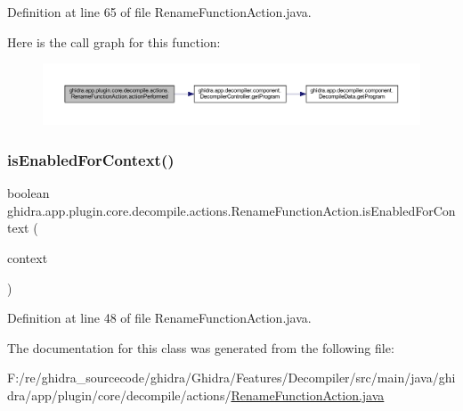 Definition at line 65 of file Rename\+Function\+Action.\+java.

Here is the call graph for this function\+:
\nopagebreak
\begin{figure}[H]
\begin{center}
\leavevmode
\includegraphics[width=350pt]{classghidra_1_1app_1_1plugin_1_1core_1_1decompile_1_1actions_1_1_rename_function_action_a67fbf7fa2650bcc9761f5f92f2d4a741_cgraph}
\end{center}
\end{figure}
\mbox{\label{classghidra_1_1app_1_1plugin_1_1core_1_1decompile_1_1actions_1_1_rename_function_action_a68d2dcd140bdd31b9eedfcca3b08450d}} 
\subsubsection{\texorpdfstring{isEnabledForContext()}{isEnabledForContext()}}
{\footnotesize\ttfamily boolean ghidra.\+app.\+plugin.\+core.\+decompile.\+actions.\+Rename\+Function\+Action.\+is\+Enabled\+For\+Context (\begin{DoxyParamCaption}\item[{Action\+Context}]{context }\end{DoxyParamCaption})\hspace{0.3cm}{\ttfamily [inline]}}



Definition at line 48 of file Rename\+Function\+Action.\+java.



The documentation for this class was generated from the following file\+:\begin{DoxyCompactItemize}
\item 
F\+:/re/ghidra\+\_\+sourcecode/ghidra/\+Ghidra/\+Features/\+Decompiler/src/main/java/ghidra/app/plugin/core/decompile/actions/\mbox{\hyperlink{_rename_function_action_8java}{Rename\+Function\+Action.\+java}}\end{DoxyCompactItemize}
